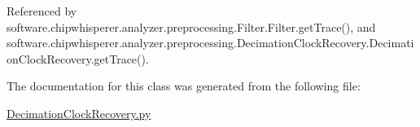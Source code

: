 Referenced by software.\+chipwhisperer.\+analyzer.\+preprocessing.\+Filter.\+Filter.\+get\+Trace(), and software.\+chipwhisperer.\+analyzer.\+preprocessing.\+Decimation\+Clock\+Recovery.\+Decimation\+Clock\+Recovery.\+get\+Trace().



The documentation for this class was generated from the following file\+:\begin{DoxyCompactItemize}
\item 
\hyperlink{DecimationClockRecovery_8py}{Decimation\+Clock\+Recovery.\+py}\end{DoxyCompactItemize}
